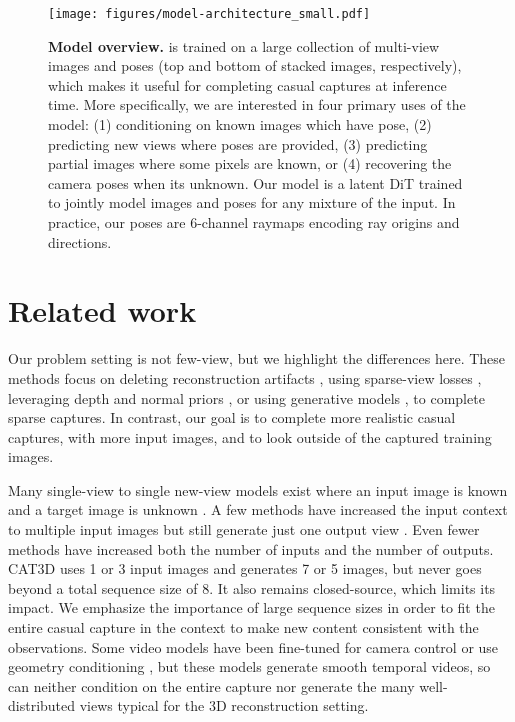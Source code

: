 \begin{figure*}[t]
\centering
\texttt{[image: figures/model-architecture\_small.pdf]}
\caption{\label{fig:model_architecture}%
    \textbf{Model overview.}
    \method is trained on a large collection of multi-view images and poses (top and bottom of stacked images, respectively), which makes it useful for completing casual captures at inference time.
    More specifically, we are interested in four primary uses of the model:
    (1) conditioning on known images which have pose,
    (2) predicting new views where poses are provided,
    (3) predicting partial images where some pixels are known, or
    (4) recovering the camera poses when its unknown.
    Our model is a latent DiT trained to jointly model images and poses for any mixture of the input.
    In practice, our poses are 6-channel raymaps encoding ray origins and directions.
    \vspace{-1.7em}
}
\end{figure*}


\section{Related work}
\label{sec:related_work}
\vspace{-0.5em}

Our problem setting is not few-view, but we highlight the differences here.
These methods focus on deleting reconstruction artifacts \cite{warburg2023nerfbusters,sabour2024spotlesssplats,goli2024bayes}, using sparse-view losses \cite{niemeyer2022regnerf}, leveraging depth and normal priors \cite{TurkuRMSRK2025}, or using generative models \cite{wu2024reconfusion,LiuCKTT2024,KantSVGRTG2023}, to complete sparse captures.
In contrast, our goal is to complete more realistic casual captures, with more input images, and to look outside of the captured training images.

Many single-view to single new-view models exist where an input image is known and a target image is unknown \cite{liu2023zero,sargent2023zeronvs,seo2024genwarp,tewari2023diffusion}.
A few methods have increased the input context to multiple input images but still generate just one output view \cite{wu2024reconfusion,jin2024lvsm}.
Even fewer methods have increased both the number of inputs and the number of outputs.
CAT3D \cite{gao2024cat3d} uses 1 or 3 input images and generates 7 or 5 images, but never goes beyond a total sequence size of 8.
It also remains closed-source, which limits its impact.
We emphasize the importance of large sequence sizes in order to fit the entire casual capture in the context to make new content consistent with the observations.
Some video models have been fine-tuned for camera control \cite{he2024cameractrl,wang2024motionctrl,VanHWOSLTDZV2024} or use geometry conditioning \cite{yu2024viewcrafter,liu2024reconx,muller2024multidiff,MVDiffusion}, but these models generate smooth temporal videos, so can neither condition on the entire capture nor generate the many well-distributed views typical for the 3D reconstruction setting.

